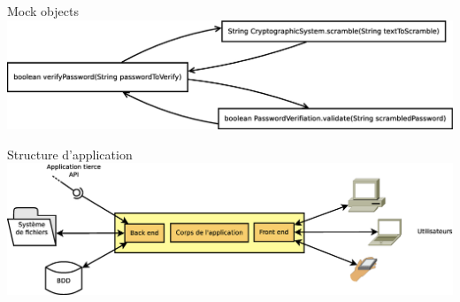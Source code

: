 \documentclass[xcolor=x11names,compress]{beamer}
\renewcommand{\(}{\begin{columns}}
\renewcommand{\)}{\end{columns}}
\newcommand{\<}[1]{\begin{column}{#1}}
\renewcommand{\>}{\end{column}}
\begin{document}
\begin{frame}{Mock objects}
  \includegraphics[scale=0.25]{images/mockObj}
\end{frame}

\begin{frame}{Structure d'application}
  \includegraphics[scale=0.24]{images/webapp}
\end{frame}
\end{document}
